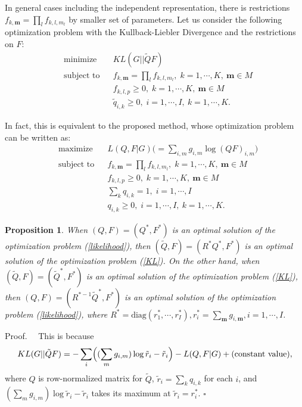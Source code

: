 \documentclass{article}
\newtheorem{prop}[thm]{Proposition}
\newcommand{\proof}{\noindent Proof.\ \ }
\begin{document}
In general cases including the independent representation, 
there is restrictions $f_{k, \bm{m}} = \prod_l f_{k, l, m_l}$ by smaller set of parameters.
Let us consider the following optimization problem with the Kullback-Liebler Divergence and the restrictions on $F$:
\begin{equation}
\begin{aligned}
& \text{minimize}
& & KL(G ||  \tilde{Q} F) \\
& \text{subject to}
& & f_{k, \bm{m}} = \prod_l f_{k, l, m_l}, \; k = 1, \cdots, K,\ \bm{m} \in M \\ & 
& & f_{k, l, p} \geq 0, \; k = 1, \cdots, K,\ \bm{m} \in M \\ & 
& & \tilde{q}_{i, k} \geq 0, \; i = 1, \cdots, I,\ k = 1, \cdots, K.
\end{aligned}
\label{KL}
\end{equation}

In fact, this is equivalent to the proposed method, whose optimization problem can be written as:
\begin{equation}
\begin{aligned}
& \text{maximize}
& & L(Q, F | G) \bigl(= \sum_{i,m}  g_{i,m} \log (Q F)_{i,m} \bigr)  \\
& \text{subject to}
& & f_{k, \bm{m}} = \prod_l f_{k, l, m_l}, \; k = 1, \cdots, K,\ \bm{m} \in M \\ & 
& & f_{k, l, p} \geq 0, \; k = 1, \cdots, K,\ \bm{m} \in M \\ & 
& & \sum_k  q_{i, k} =  1, \; i = 1, \cdots, I \\ &
& & q_{i, k} \geq 0, \; i = 1, \cdots, I,\ k = 1, \cdots, K.
\end{aligned}
\label{likelihood}
\end{equation}

\begin{prop}
When $(Q, F) = (Q^*, F^*)$ is an optimal solution of the optimization problem (\ref{likelihood}), 
then $(\tilde{Q}, F) = (R^* Q^*, F^*)$ is an optimal solution of the optimization problem (\ref{KL}).
On the other hand, when $(\tilde{Q}, F) = (\tilde{Q}^*, F^*)$ is an optimal solution of the optimization problem (\ref{KL}),
then $(Q, F) = (R^{*-1} \tilde{Q}^*, F^*)$ is an optimal solution of the optimization problem (\ref{likelihood}),
where $R^* = \text{diag} (r_1^*, \cdots, r_I^*), r_i^* = \sum_{\bm{m}} g_{i,\bm{m}}, i = 1, \cdots, I$.
\end{prop}
\proof
This is because
\begin{equation*}
KL(G ||  \tilde{Q} F) = -  \sum_i \Bigl( ( \sum_{m} g_{i, m} ) \log \tilde{r}_i - \tilde{r}_i \Bigr)  - L(Q, F | G) + \text{(constant value)},
\end{equation*}
where $Q$ is row-normalized matrix for $\tilde{Q}$, $\tilde{r}_i = \sum_k q_{i, k}$ for each $i$, 
and $( \sum_{m} g_{i, m} ) \log \tilde{r}_i - \tilde{r}_i$ takes its maximum at $\tilde{r}_i = r_i^*$.
\hfill $\square$
\end{document}
